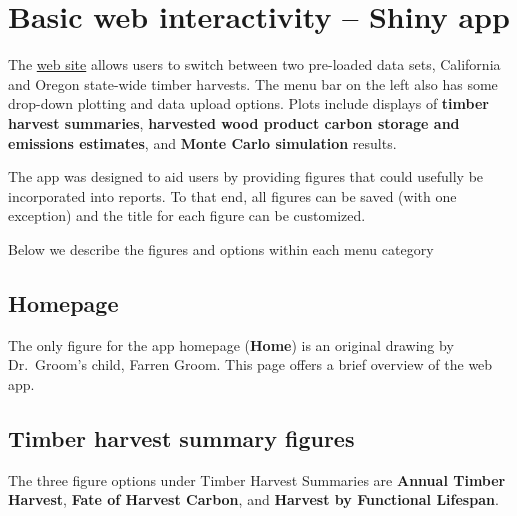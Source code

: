 \documentclass[
  openany]{book}
\begin{document}
\hypertarget{app-shiny}{%
\section{Basic web interactivity -- Shiny app}\label{app-shiny}}

The \href{https://groomanalyticsllc.shinyapps.io/HWP-C-vR/}{web site}
allows users to switch between two pre-loaded data sets, California and
Oregon state-wide timber harvests. The menu bar on the left also has
some drop-down plotting and data upload options. Plots include displays
of \textbf{timber harvest summaries}, \textbf{harvested wood product
carbon storage and emissions estimates}, and \textbf{Monte Carlo
simulation} results.

The app was designed to aid users by providing figures that could
usefully be incorporated into reports. To that end, all figures can be
saved (with one exception) and the title for each figure can be
customized.

Below we describe the figures and options within each menu category

\hypertarget{app-shiny-home}{%
\subsection{Homepage}\label{app-shiny-home}}

The only figure for the app homepage (\textbf{Home}) is an original
drawing by Dr.~Groom's child, Farren Groom. This page offers a brief
overview of the web app.

\hypertarget{app-shiny-timber}{%
\subsection{Timber harvest summary figures}\label{app-shiny-timber}}

The three figure options under Timber Harvest Summaries are
\textbf{Annual Timber Harvest}, \textbf{Fate of Harvest Carbon}, and
\textbf{Harvest by Functional Lifespan}.
\end{document}
